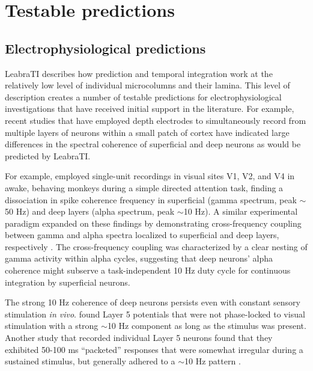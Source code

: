 \documentclass[dwyatte_dissertation.tex]{subfiles}
\begin{document}
\section{Testable predictions}
\subsection{Electrophysiological predictions}
LeabraTI describes how prediction and temporal integration work at the relatively low level of individual microcolumns and their lamina. This level of description creates a number of testable predictions for electrophysiological investigations that have received initial support in the literature. For example, recent studies that have employed depth electrodes to simultaneously record from multiple layers of neurons within a small patch of cortex have indicated large differences in the spectral coherence of superficial and deep neurons \cite{MaierAdamsAuraEtAl10} as would be predicted by LeabraTI.

For example,  employed single-unit recordings in visual sites V1, V2, and V4 in awake, behaving monkeys during a simple directed attention task, finding a dissociation in spike coherence frequency in superficial (gamma spectrum, peak $\sim$50 Hz) and deep layers (alpha spectrum, peak $\sim$10 Hz). A similar experimental paradigm expanded on these findings by demonstrating cross-frequency coupling between gamma and alpha spectra localized to superficial and deep layers, respectively \cite{SpaakBonnefondMaierEtAl12}. The cross-frequency coupling was characterized by a clear nesting of gamma activity within alpha cycles, suggesting that deep neurons' alpha coherence might subserve a task-independent 10 Hz duty cycle \cite{JensenMazaheri10,JensenBonnefondVanRullen12} for continuous integration by superficial neurons.

The strong 10 Hz coherence of deep neurons persists even with constant sensory stimulation \textit{in vivo}.  found Layer 5 potentials that were not phase-locked to visual stimulation with a strong $\sim$10 Hz component as long as the stimulus was present. Another study that recorded individual Layer 5 neurons found that they exhibited 50-100 ms ``packeted'' responses that were somewhat irregular during a sustained stimulus, but generally adhered to a $\sim$10 Hz pattern \cite{LuczakBarthoHarris13}. 
\end{document}
